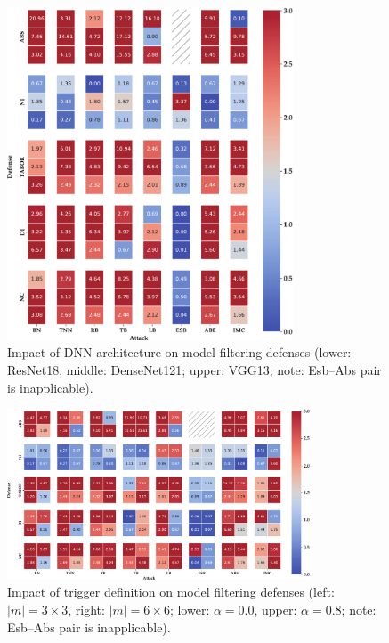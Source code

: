 \documentclass[compsoc,conference,a4paper,10pt,times]{IEEEtran}
\newcommand{\esb}{{\sc Esb}\xspace}
\newcommand{\abs}{{\sc Abs}\xspace}
\begin{document}
\begin{figure}[!ht]
    \centering
    \includegraphics[width=85mm]{figures/defense/defense-model-model_inspection.pdf}
    \caption{Impact of DNN architecture on model filtering defenses (lower:  ResNet18, middle:  DenseNet121; upper:  VGG13; note: \esb--\abs pair is inapplicable).}
    \label{fig:defense-model-model_inspection}
\end{figure}


\begin{figure}[!ht]
    \centering
    \includegraphics[width=90mm]{figures/defense/defense-trigger-model_inspection.pdf}
    \caption{Impact of trigger definition on model filtering defenses (left:  $|m|=3\times3$, right:  $|m|=6\times6$; lower:  $\alpha=0.0$, upper:  $\alpha=0.8$; note: \esb--\abs pair is inapplicable).}
    \label{fig:defense-trigger-model_inspection}
\end{figure}
\end{document}
